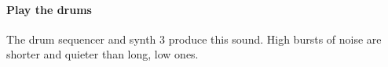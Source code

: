 \paragraph{Play the drums}
The drum sequencer and synth 3 produce this sound. High bursts of noise
are shorter and quieter than long, low ones. 